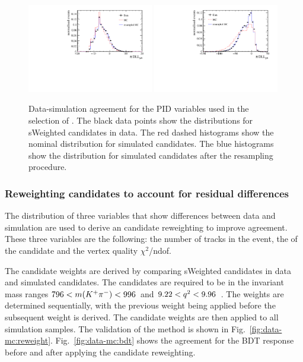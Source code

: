 \begin{figure}[!htb]
 \includegraphics[width=0.49\textwidth]{figs/kpimm/data-mc/resampling/Pi_PIDmu.pdf}
 \includegraphics[width=0.49\textwidth]{figs/kpimm/data-mc/resampling/Pi_PIDp.pdf}
 \caption{Data-simulation agreement for the PID variables used in the selection of \BdToKpimm. The black data points show the distributions for sWeighted \BdToJPsiKst candidates in data. The red dashed histograms show the nominal distribution for simulated \BdToJPsiKst candidates. The blue histograms show the distribution for simulated \BdToJPsiKst candidates after the resampling procedure.}
\label{fig:kpimm:data-mc:pid}
\end{figure}

\subsubsection{Reweighting candidates to account for residual differences}
\label{sec:kpimm:data-mc:reweight}

The distribution of three variables that show differences between data and simulation are used to derive an candidate reweighting to improve agreement. These three variables are the following: the number of tracks in the event, the \pt of the \Bz candidate and the \Bz vertex quality $\chi^{2}$/ndof.
 
The candidate weights are derived by comparing sWeighted \BdToJPsiKst candidates in data and simulated \BdToJPsiKst candidates. The candidates are required to be in the invariant mass ranges $796<m({{K}^+}{{\pi}^-})<996$~\mevcc and $9.22<{q^2}<9.96$~\gevgevcccc. The weights are determined sequentially, with the previous weight being applied before the subsequent weight is derived. The candidate weights are then applied to all simulation samples. The validation of the method is shown in Fig.~\ref{fig:data-mc:reweight}. Fig.~\ref{fig:data-mc:bdt} shows the agreement for the BDT response before and after applying the candidate reweighting.

